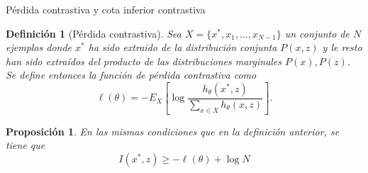 \documentclass[aspectratio=169]{beamer}
\newtheorem{defi}{Definición}
\newtheorem{prop}{Proposición}
\begin{document}
  
  \begin{frame}{Pérdida contrastiva y cota inferior contrastiva}
    
    \begin{defi}[Pérdida contrastiva]
      Sea \(X =\{x^*,x_1,\dots,x_{N-1}\}\) un conjunto de \(N\) ejemplos donde $x^*$ ha sido extraido de la distribución conjunta \(P(x,z)\) y le resto han sido extraídos del producto de las distribuciones marginales \(P(x),P(z)\). Se define entonces la función de pérdida contrastiva como  
      \[ 
        \ell(\theta) = - E_X \left[ \log \frac{h_\theta(x^*,z)}{\sum_{x \in X}h_\theta(x,z)}\right]. 
        \]
    \end{defi}

    \pause
    \begin{prop}
      En las mismas condiciones que en la definición anterior, se tiene que
      \[
        I(x^*,z) \geq -  \ell(\theta) + \log N
      \]
    \end{prop}
  
  \end{frame}
  
\end{document}
